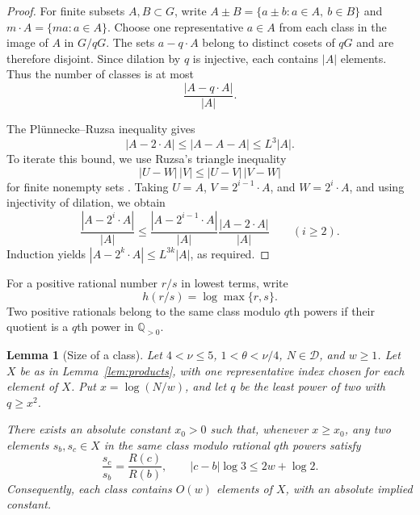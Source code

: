 \documentclass[11pt,reqno]{amsart}
\newtheorem{lemma}{Lemma}[section]
\theoremstyle{definition}
\newcommand{\Q}{\mathbb Q}
\newcommand{\DD}{\mathcal D}
\begin{document}
\begin{proof}
For finite subsets $A,B\subset G$, write
$A\pm B=\{a\pm b:a\in A,\ b\in B\}$ and
$m\cdot A=\{ma:a\in A\}$. Choose one representative
$a\in A$ from each class in the image of $A$ in
$G/qG$. The sets $a-q\cdot A$ belong to distinct
cosets of $qG$ and are therefore disjoint.
Since dilation by $q$ is injective, each contains
$|A|$ elements. Thus the number of classes is
at most
\[
 \frac{|A-q\cdot A|}{|A|}.
\]

The Pl\"unnecke--Ruzsa inequality
\cite[Theorem~1.2]{Petridis} gives
\[
 |A-2\cdot A|\le|A-A-A|\le L^3|A|.
\]
To iterate this bound, we use Ruzsa's triangle
inequality
\[
 |U-W|\,|V|\le|U-V|\,|V-W|
\]
for finite nonempty sets
\cite[proof of Theorem~1.2, (3)]{Petridis}.
Taking $U=A$, $V=2^{i-1}\cdot A$, and
$W=2^i\cdot A$, and using injectivity of
dilation, we obtain
\[
 \frac{|A-2^i\cdot A|}{|A|}
 \le
 \frac{|A-2^{i-1}\cdot A|}{|A|}
 \frac{|A-2\cdot A|}{|A|}
 \qquad(i\ge2).
\]
Induction yields
$|A-2^k\cdot A|\le L^{3k}|A|$, as required.
\end{proof}

For a positive rational number $r/s$ in lowest
terms, write
\[
 h(r/s)=\log\max\{r,s\}.
\]
Two positive rationals belong to the same class
modulo $q$th powers if their quotient is a $q$th
power in $\Q_{>0}$.

\begin{lemma}[Size of a class]\label{lem:one-class}
Let $4<\nu\le5$, $1<\theta<\nu/4$,
$N\in\DD$, and $w\ge1$. Let $X$ be as in
Lemma~\ref{lem:products}, with one representative
index chosen for each element of $X$.
Put $x=\log(N/w)$, and let $q$ be the least
power of two with $q\ge x^2$.

There exists an absolute constant $x_0>0$ such
that, whenever $x\ge x_0$, any two elements
$s_b,s_c\in X$ in the same class modulo rational
$q$th powers satisfy
\[
 \frac{s_c}{s_b}=\frac{R(c)}{R(b)},
 \qquad
 |c-b|\log3\le2w+\log2.
\]
Consequently, each class contains $O(w)$
elements of $X$, with an absolute implied constant.
\end{lemma}
\end{document}
